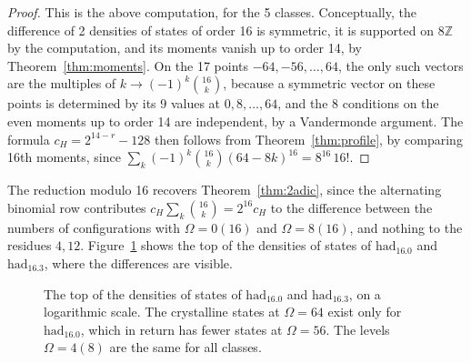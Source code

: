 \documentclass[11pt,a4paper]{article}
\theoremstyle{remark}
\begin{document}
\begin{proof}
This is the above computation, for the 5 classes. Conceptually, the difference of 2 densities of states of order 16 is symmetric, it is supported on $8\mathbb Z$ by the computation, and its moments vanish up to order 14, by Theorem~\ref{thm:moments}. On the 17 points $-64,-56,\ldots,64$, the only such vectors are the multiples of $k\to(-1)^k\binom{16}{k}$, because a symmetric vector on these points is determined by its 9 values at $0,8,\ldots,64$, and the 8 conditions on the even moments up to order 14 are independent, by a Vandermonde argument. The formula $c_H=2^{14-r}-128$ then follows from Theorem~\ref{thm:profile}, by comparing 16th moments, since $\sum_k(-1)^k\binom{16}{k}(64-8k)^{16}=8^{16}\,16!$.
\end{proof}

The reduction modulo 16 recovers Theorem~\ref{thm:2adic}, since the alternating binomial row contributes $c_H\sum_k\binom{16}{k}=2^{16}c_H$ to the difference between the numbers of configurations with $\Omega=0(16)$ and $\Omega=8(16)$, and nothing to the residues $4,12$. Figure~\ref{fig:dos} shows the top of the densities of states of $\mathrm{had}_{16.0}$ and $\mathrm{had}_{16.3}$, where the differences are visible.

\begin{figure}[htb!]
\centering
{}
\caption{The top of the densities of states of $\mathrm{had}_{16.0}$ and $\mathrm{had}_{16.3}$, on a logarithmic scale. The crystalline states at $\Omega=64$ exist only for $\mathrm{had}_{16.0}$, which in return has fewer states at $\Omega=56$. The levels $\Omega=4(8)$ are the same for all classes.}\label{fig:dos}
\end{figure}
\end{document}
